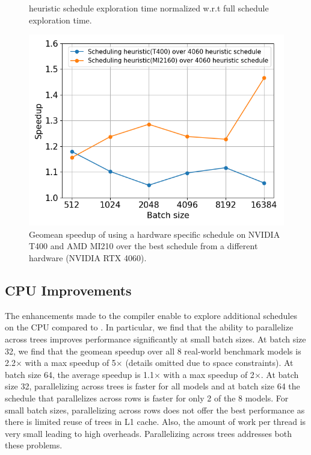 \begin{figure}[htb]
\begin{minipage}[t]{.3\linewidth}
{  heuristic schedule exploration time normalized w.r.t full schedule exploration time.}
  \label{Fig:HeuristicVsFullExplore_Speedup}
\end{minipage}
\hspace{0.5cm}
\begin{minipage}[t]{.3\linewidth}
  \centering
  \includegraphics[width=\linewidth]{figures/geomean_speedup_T400_4060_vs_T400_vs_MI2160.png}
  \caption{Geomean speedup of using a hardware specific schedule on NVIDIA T400 and AMD MI210 over the best schedule from a different hardware (NVIDIA RTX 4060).}
  \label{Fig:AutotuningSpeedupvs4060Sched}
\end{minipage}
\end{figure}

\subsection{CPU Improvements}
The enhancements made to the compiler enable \Treebeard{} to explore additional schedules on the CPU
compared to \TreebeardOLD{}. 
In particular, we find that the ability to parallelize across trees improves performance 
significantly at small batch sizes. At batch size 32, we find that the geomean speedup over 
all 8 real-world benchmark models is 2.2$\times$ with a max speedup of 5$\times$ (details omitted 
due to space constraints). At batch size 64, the average speedup
is 1.1$\times$ with a max speedup of 2$\times$. At batch size 32, parallelizing across trees is faster 
for all models and at batch size 64 the \TreebeardOLD{} schedule that parallelizes across 
rows is faster for only 2 of the 8 models. For small batch sizes, parallelizing across rows does 
not offer the best performance as there is limited reuse of trees in L1 cache.
Also, the amount of work per thread is very small leading to high overheads. 
Parallelizing across trees addresses both these problems. 

